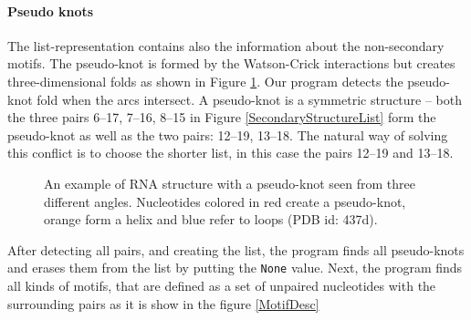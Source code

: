 \documentclass[12pt]{article}
\begin{document}
\paragraph{Pseudo knots}
The list-representation contains also the information about the non-secondary motifs. The pseudo-knot is formed by the Watson-Crick interactions but creates three-dimensional folds as shown in Figure \ref{PseudoKnot}. Our program detects the pseudo-knot fold when the arcs intersect. A pseudo-knot is a symmetric structure -- both the three pairs 6--17, 7--16, 8--15  in Figure \ref{SecondaryStructureList} form the pseudo-knot as well as the two pairs: 12--19, 13--18. The natural way of solving this conflict is to choose the shorter list, in this case the pairs 12--19 and 13--18.  
\begin{figure}[h!]
\begin{center}
\end{center}
\caption{An example of RNA structure with a pseudo-knot seen from three different angles. Nucleotides colored in red create a pseudo-knot, orange form a helix and blue refer to loops (PDB id: 437d).}
\label{PseudoKnot}
\end{figure}
\newpage
After detecting all pairs, and creating the list, the program finds all pseudo-knots and erases them from the list by putting the \texttt{None} value. Next, the program finds all kinds of motifs, that are defined as a set of unpaired nucleotides with the surrounding pairs as it is show in the figure \ref{MotifDesc}
\end{document}
